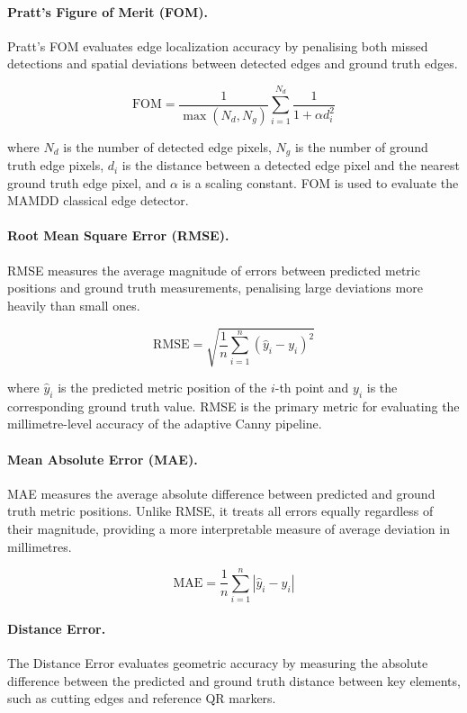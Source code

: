 \documentclass[11pt]{article}
\begin{document}
\paragraph{Pratt's Figure of Merit (FOM).}
Pratt's FOM evaluates edge localization accuracy by penalising both missed 
detections and spatial deviations between detected edges and ground truth edges.

\[
\text{FOM} = \frac{1}{\max(N_d, N_g)} \sum_{i=1}^{N_d} \frac{1}{1 + \alpha d_i^2}
\]

where $N_d$ is the number of detected edge pixels, $N_g$ is the number of ground 
truth edge pixels, $d_i$ is the distance between a detected edge pixel and the 
nearest ground truth edge pixel, and $\alpha$ is a scaling constant. FOM is used 
to evaluate the MAMDD classical edge detector.

\paragraph{Root Mean Square Error (RMSE).}
RMSE measures the average magnitude of errors between predicted metric positions 
and ground truth measurements, penalising large deviations more heavily than 
small ones.

\[
\text{RMSE} = \sqrt{\frac{1}{n} \sum_{i=1}^{n} (\hat{y}_i - y_i)^2}
\]

where $\hat{y}_i$ is the predicted metric position of the $i$-th point and $y_i$ 
is the corresponding ground truth value. RMSE is the primary metric for evaluating 
the millimetre-level accuracy of the adaptive Canny pipeline.

\paragraph{Mean Absolute Error (MAE).}
MAE measures the average absolute difference between predicted and ground truth 
metric positions. Unlike RMSE, it treats all errors equally regardless of their 
magnitude, providing a more interpretable measure of average deviation in 
millimetres.

\[
\text{MAE} = \frac{1}{n} \sum_{i=1}^{n} |\hat{y}_i - y_i|
\]

\paragraph{Distance Error.}
The Distance Error evaluates geometric accuracy by measuring the absolute 
difference between the predicted and ground truth distance between key elements, 
such as cutting edges and reference QR markers.
\end{document}
